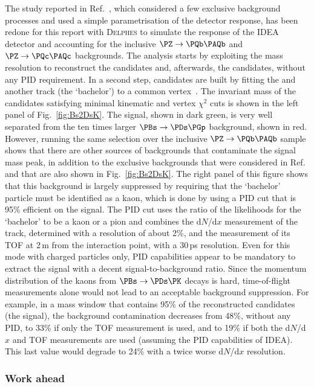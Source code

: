 The study reported in Ref.~\cite{Aleksan:2021gii}, which considered a few exclusive background processes and used a simple parametrisation of the detector response, 
has been redone for this report with \textsc{Delphes} to simulate the response of the IDEA detector and accounting for the inclusive $\PZ \to \PQb \PAQb$ and $\PZ \to \PQc\PAQc$ backgrounds. 
The analysis starts by exploiting the mass resolution to reconstruct the \PGf candidates and, afterwards, the \PDs candidates, without any PID requirement. 
In a second step, \PBs candidates are built by fitting the \PDs and another track (the `bachelor') to a common vertex~\cite{BedeschiCode}. 
The invariant mass of the \PBs candidates satisfying minimal kinematic and vertex $\chi^2$ cuts is shown in the left panel of Fig.~\ref{fig:Bs2DsK}. 
The signal, shown in dark green, is very well separated from the ten times larger $\PBs \to \PDs \PGp$ background, shown in red. 
However, running the same selection over the inclusive $\PZ \to \PQb\PAQb$ sample shows that there are other sources of backgrounds that contaminate the signal mass peak, 
in addition to the exclusive backgrounds that were considered in Ref.~\cite{Aleksan:2021gii} and that are also shown in Fig.~\ref{fig:Bs2DsK}. 
The right panel of this figure shows that this background is largely suppressed by requiring that the `bachelor' particle must be identified as a kaon, 
which is done by using a PID cut that is 95\% efficient on the signal. 
The PID cut uses the ratio of the likelihoods for the `bachelor' to be a kaon or a pion and combines the d$N$/d$x$ measurement of the track, 
determined with a resolution of about 2\%, and the measurement of its TOF at 2\,m from the interaction point, with a 30\,ps resolution. 
Even for this mode with charged particles only, PID capabilities appear to be mandatory to extract the signal with a decent signal-to-background ratio. 
Since the momentum distribution of the kaons from $\PBs \to \PDs \PK$ decays is hard, time-of-flight measurements alone would not lead to an acceptable background suppression. 
For example, in a mass window that contains 95\% of the reconstructed \PBs candidates (the signal), 
the background contamination decreases from 48\%, without any PID, 
to 33\% if only the TOF measurement is used, 
and to 19\% if both the d$N$/d$x$ and TOF measurements are used (assuming the PID capabilities of IDEA). 
This last value would degrade to 24\% with a twice worse d$N$/d$x$ resolution.

\subsubsection{Work ahead}

